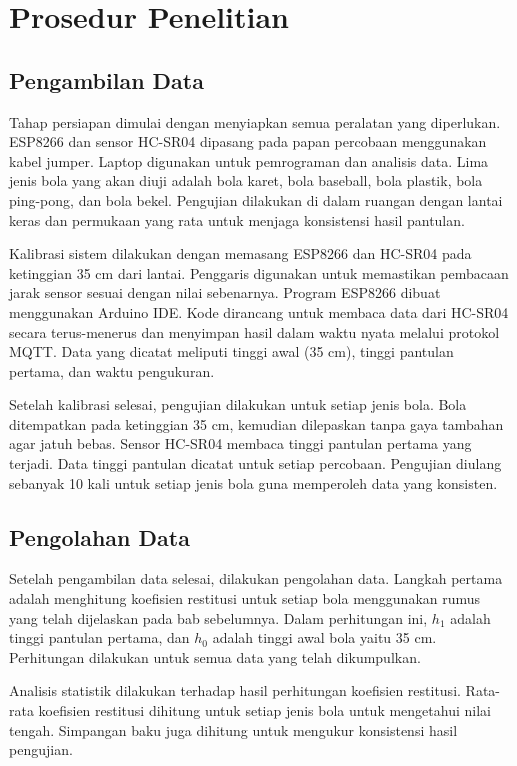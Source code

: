 \section{Prosedur Penelitian}
\subsection{Pengambilan Data}
Tahap persiapan dimulai dengan menyiapkan semua peralatan yang diperlukan. ESP8266 dan sensor HC-SR04 dipasang pada papan percobaan menggunakan kabel jumper. Laptop digunakan untuk pemrograman dan analisis data. Lima jenis bola yang akan diuji adalah bola karet, bola baseball, bola plastik, bola ping-pong, dan bola bekel. Pengujian dilakukan di dalam ruangan dengan lantai keras dan permukaan yang rata untuk menjaga konsistensi hasil pantulan.

Kalibrasi sistem dilakukan dengan memasang ESP8266 dan HC-SR04 pada ketinggian 35 cm dari lantai. Penggaris digunakan untuk memastikan pembacaan jarak sensor sesuai dengan nilai sebenarnya. Program ESP8266 dibuat menggunakan Arduino IDE. Kode dirancang untuk membaca data dari HC-SR04 secara terus-menerus dan menyimpan hasil dalam waktu nyata melalui protokol MQTT. Data yang dicatat meliputi tinggi awal (35 cm), tinggi pantulan pertama, dan waktu pengukuran.

Setelah kalibrasi selesai, pengujian dilakukan untuk setiap jenis bola. Bola ditempatkan pada ketinggian 35 cm, kemudian dilepaskan tanpa gaya tambahan agar jatuh bebas. Sensor HC-SR04 membaca tinggi pantulan pertama yang terjadi. Data tinggi pantulan dicatat untuk setiap percobaan. Pengujian diulang sebanyak 10 kali untuk setiap jenis bola guna memperoleh data yang konsisten.

\subsection{Pengolahan Data}
Setelah pengambilan data selesai, dilakukan pengolahan data. Langkah pertama adalah menghitung koefisien restitusi untuk setiap bola menggunakan rumus yang telah dijelaskan pada bab sebelumnya. Dalam perhitungan ini, $h_1$ adalah tinggi pantulan pertama, dan $h_0$ adalah tinggi awal bola yaitu 35 cm. Perhitungan dilakukan untuk semua data yang telah dikumpulkan.

Analisis statistik dilakukan terhadap hasil perhitungan koefisien restitusi. Rata-rata koefisien restitusi dihitung untuk setiap jenis bola untuk mengetahui nilai tengah. Simpangan baku juga dihitung untuk mengukur konsistensi hasil pengujian.

